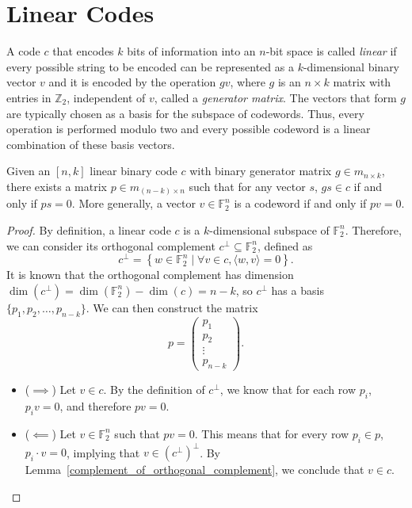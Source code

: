 \chapter{Linear Codes}

\begin{definition}\label{linear_code}
A code $c$ that encodes $k$ bits of information into an $n$-bit space is called \textit{linear} if every possible string to be encoded can be represented as a $k$-dimensional binary vector $v$ and it is encoded by the operation $gv$, where $g$ is an $n \times k$ matrix with entries in $\mathbb{Z}_2$, independent of $v$, called a \textit{generator matrix}. The vectors that form $g$ are typically chosen as a basis for the subspace of codewords. Thus, every operation is performed modulo two and every possible codeword is a linear combination of these basis vectors. \cite{https://doi.org/10.48550/arxiv.quant-ph/9705052}
\end{definition}

\begin{theorem}\label{dual_matrix_of_a_linear_code}
Given an $[n, k]$ linear binary code $c$ with binary generator matrix $g \in m_{n \times k}$, there exists a matrix $p \in m_{(n - k)\times n}$ such that for any vector $s$, $g s \in c$ if and only if $p s = 0$. More generally, a vector $v \in \mathbb{F}^n_2$ is a codeword if and only if $pv = 0$.
\end{theorem}

\begin{proof}\label{proof_dual_matrix_of_a_linear_code}
By definition, a linear code $c$ is a $k$-dimensional subspace of $\mathbb{F}^n_2$. Therefore, we can consider its orthogonal complement $c^\perp \subseteq \mathbb{F}^n_2$, defined as
\begin{equation}
c^\perp = \left\{w \in \mathbb{F}^n_2 \mid \forall v \in c, \langle w, v \rangle = 0\right\}.
\end{equation}
It is known that the orthogonal complement has dimension $\dim(c^\perp) = \dim(\mathbb{F}^n_2) - \dim(c) = n - k$, so $c^\perp$ has a basis $\{p_1, p_2, \ldots, p_{n - k} \}$. We can then construct the matrix
\begin{equation}
p = \begin{pmatrix}p_1 \\ p_2 \\ \vdots \\ p_{n - k} \end{pmatrix}.
\end{equation}

\begin{itemize}
\item ($\implies$) Let $v \in c$. By the definition of $c^\perp$, we know that for each row $p_i$, $p_i v = 0$, and therefore $pv = 0$.
\item ($\impliedby$) Let $v \in \mathbb{F}^n_2$ such that $p v = 0$. This means that for every row $p_i \in p$, $p_i \cdot v = 0$, implying that $v \in (c^\perp)^\perp$. By Lemma~\ref{complement_of_orthogonal_complement}, we conclude that $v \in c$.
\end{itemize}
\end{proof}

